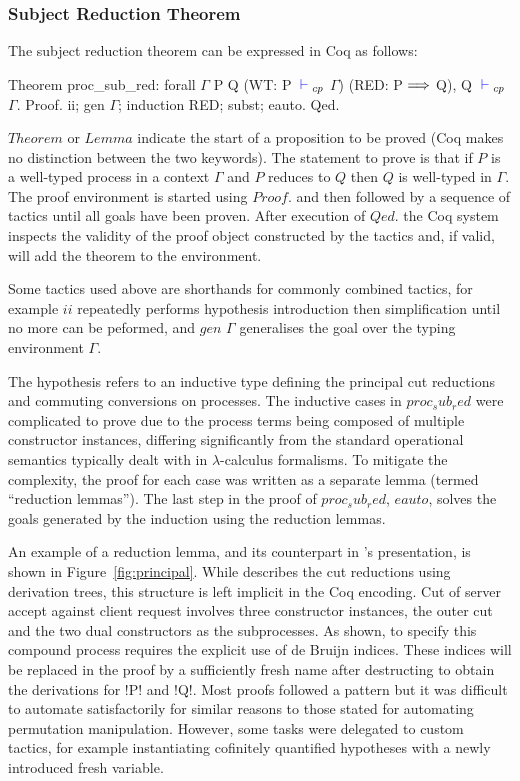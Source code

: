 \subsubsection{Subject Reduction Theorem}

The subject reduction theorem can be expressed in Coq as follows:
\begin{coq}
Theorem proc_sub_red:
  forall $\Gamma$ P Q
         (WT: P ${\color{blue} {} \vdash {}}_{cp}$ $\Gamma$)
         (RED: P $\Longrightarrow$ Q),
    Q ${\color{blue} {} \vdash {}}_{cp}$ $\Gamma$.
Proof. ii; gen $\Gamma$; induction RED; subst; eauto. Qed.
\end{coq}

\coqe$Theorem$ or \coqe$Lemma$ indicate the start of a proposition to be
proved (Coq makes no distinction between the two keywords). The statement to
prove is that if \coqe$P$ is a well-typed process in a context $\Gamma$ and
\coqe$P$ reduces to \coqe$Q$ then \coqe$Q$ is well-typed in $\Gamma$. The
proof environment is started using \coqe$Proof.$ and then followed by a
sequence of tactics until all goals have been proven. After execution of
\coqe$Qed.$ the Coq system inspects the validity of the proof object
constructed by the tactics and, if valid, will add the theorem to the
environment.

Some tactics used above are shorthands for commonly combined tactics, for
example \coqe$ii$ repeatedly performs hypothesis introduction then
simplification until no more can be peformed, and \coqe$gen$ $\Gamma$
generalises the goal over the typing environment $\Gamma$.



The  hypothesis refers to an inductive type defining the principal
cut reductions and commuting conversions on processes. The inductive cases in
\coqe$proc_sub_red$ were complicated to prove due to the process terms being
composed of multiple constructor instances, differing significantly from the
standard operational semantics typically dealt with in $\lambda$-calculus
formalisms. To mitigate the complexity, the proof for each case was written as
a separate lemma (termed ``reduction lemmas''). The last step in the proof of
\coqe$proc_sub_red$, \coqe$eauto$, solves the goals generated by the induction
using the reduction lemmas.

An example of a reduction lemma, and its counterpart in
\citeauthor{Wadler:2014}'s presentation, is shown in
Figure~\ref{fig:principal}. While \citeauthor{Wadler:2014} describes the cut
reductions using derivation trees, this structure is left implicit in the Coq
encoding. Cut of server accept against client request involves three
constructor instances, the outer cut and the two dual constructors as the
subprocesses. As shown, to specify this compound process requires the explicit
use of de Bruijn indices. These indices will be replaced in the proof by a
sufficiently fresh name after destructing  to obtain the derivations
for \coqe!P! and \coqe!Q!. Most proofs followed a pattern but it was difficult
to automate satisfactorily for similar reasons to those stated for automating
permutation manipulation. However, some tasks were delegated to custom
tactics, for example instantiating cofinitely quantified hypotheses with a
newly introduced fresh variable.

